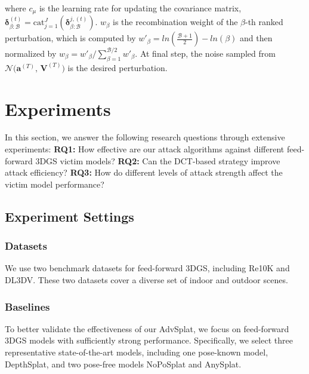 \documentclass[runningheads]{llncs}
\begin{document}
where $c_\mu$ is the learning rate for updating the covariance matrix, $\bm{\delta}^{(t)}_{\beta:\mathcal{B}}={\text{cat}}_{j=1}^J\allowbreak
(\bm{\delta}_{\beta:\mathcal{B}}^{j,(t)})$. $w_\beta$ is the recombination weight of the $\beta$-th ranked perturbation, which is computed by $w'_\beta=ln(\frac{\mathcal{B}+1}{2})-ln(\beta)$ and then normalized by $w_\beta=w'_\beta/\sum_{\beta=1}^{\mathcal{B}/2}w'_\beta$. At final step, the noise sampled from $\mathcal{N}\!\bigl(\bm{a}^{(T)},\,\bm{V}^{(T)}\bigr)$ is the desired perturbation. 



\section{Experiments}
In this section, we answer the following research questions through extensive experiments: \textbf{RQ1:} How effective are our attack algorithms against different feed-forward 3DGS victim models?
\textbf{RQ2:} Can the DCT-based strategy improve attack efficiency? \textbf{RQ3:} How do different levels of attack strength affect the victim model performance?


\subsection{Experiment Settings}
\subsubsection{Datasets}
We use two benchmark datasets for feed-forward 3DGS, including Re10K\cite{zhou2018stereo} and DL3DV\cite{ling2024dl3dv}. These two datasets cover a diverse set of indoor and outdoor scenes.


\subsubsection{Baselines}
To better validate the effectiveness of our AdvSplat, we focus on feed-forward 3DGS models with sufficiently strong performance. Specifically, we select three representative state-of-the-art models, including one pose-known model, DepthSplat\cite{xu2025depthsplat}, and two  pose-free models NoPoSplat\cite{ye2024no} and AnySplat\cite{jiang2025anysplat}.
\end{document}
